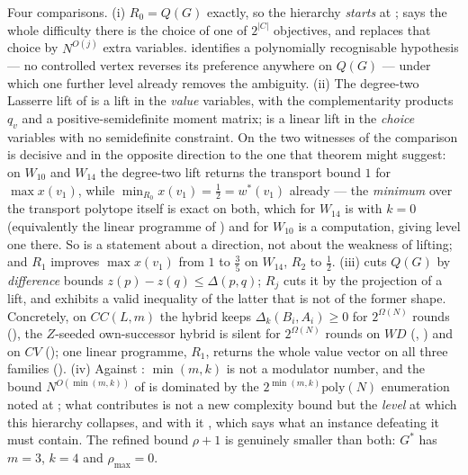 \begin{remark}
\label{cl:relation}
Four comparisons.
(i) $R_0=Q(G)$ exactly, so the hierarchy \emph{starts} at ;
 says the whole difficulty there is the choice of
one of $2^{|C|}$ objectives, and  replaces that choice by
$N^{O(j)}$ extra variables.  identifies a polynomially
recognisable hypothesis --- no controlled vertex reverses its preference
anywhere on $Q(G)$ --- under which one further level already removes the
ambiguity.
(ii) The degree-two Lasserre lift of  is a lift in the
\emph{value} variables, with the complementarity products $q_v$ and a
positive-semidefinite moment matrix;  is a linear lift in the
\emph{choice} variables with no semidefinite constraint. On the two witnesses
of  the comparison is decisive and in the opposite
direction to the one that theorem might suggest: on $W_{10}$ and $W_{14}$ the
degree-two lift returns the transport bound $1$ for $\max x(v_1)$, while
$\min_{R_0}x(v_1)=\frac12=w^{\ast}(v_1)$ already --- the \emph{minimum} over
the transport polytope itself is exact on both, which for $W_{14}$ is
 with $k=0$ (equivalently the linear programme of
) and for $W_{10}$ is a computation, 
giving level one there.
So  is a statement about a direction, not about the
weakness of lifting; and $R_1$ improves $\max x(v_1)$ from $1$ to $\frac35$ on
$W_{14}$, $R_2$ to $\frac12$.
(iii)  cuts $Q(G)$ by \emph{difference} bounds
$z(p)-z(q)\le\Delta(p,q)$; $R_j$ cuts it by the projection of a lift, and
 exhibits a valid inequality of the latter that is not of the
former shape. Concretely, on $CC(L,m)$ the hybrid keeps
$\Delta_k(B_i,A_i)\ge0$ for $2^{\Omega(N)}$ rounds
(), the $Z$-seeded own-successor hybrid is silent for
$2^{\Omega(N)}$ rounds on $WD$ (,
) and on $CV$ (); one linear
programme,
$R_1$, returns the whole value vector on all three families
().
(iv) Against : $\min(m,k)$ is not a modulator number, and
the bound $N^{O(\min(m,k))}$ of  is dominated by the
$2^{\min(m,k)}\mathrm{poly}(N)$ enumeration noted at ;
what  contributes is not a new complexity bound but the
\emph{level} at which this hierarchy collapses, and with it
, which says what an instance defeating it must contain.
The refined bound $\rho+1$ is genuinely smaller than both: $G^{\ast}$ has
$m=3$, $k=4$ and $\rho_{\max}=0$.
\end{remark}

